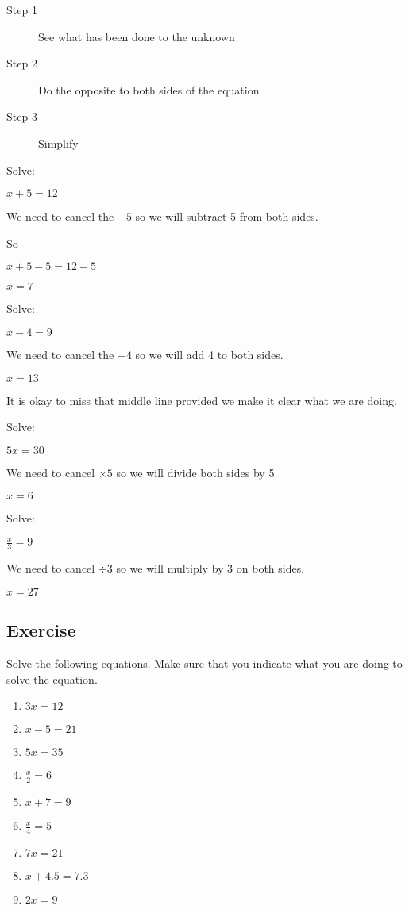 \begin{description}
	\item [Step 1] See what has been done to the unknown
	\item [Step 2] Do the opposite to both sides of the equation
	\item [Step 3] Simplify
\end{description}
\begin{exmp}

Solve:

$x + 5 = 12$

We need to cancel the $+5$ so we will subtract 5 from both sides.

So

$x + 5 -5 = 12 -5 $

$x = 7$

\noindent Solve:

$x - 4 = 9$

We need to cancel the $-4$ so we will add 4 to both sides.

$x = 13$

It is okay to miss that middle line provided we make it clear what we are doing.

\noindent Solve:

$5x = 30$

We need to cancel $\times 5$ so we will divide both sides by 5

$x = 6$

\noindent Solve:

\bigskip

$\displaystyle \frac{x}{3} = 9$

\bigskip
We need to cancel $\div 3$ so we will multiply by 3 on both sides.

$x = 27$
\end{exmp}
\subsection{Exercise}
Solve the following equations.  Make sure that you indicate what you are doing to solve the equation.
\begin{multicols}{3}
\begin{enumerate}
	\item $3x = 12$
	\item $x - 5 = 21$
	\item $5x = 35$
	\item $\displaystyle \frac{x}{2} = 6$
	\item $x + 7 = 9$
	\item $\displaystyle \frac{x}{4} = 5$
	\item $7x = 21$
	\item $x + 4.5 = 7.3$
	\item $2x = 9$
\end{enumerate}
\end{multicols}
